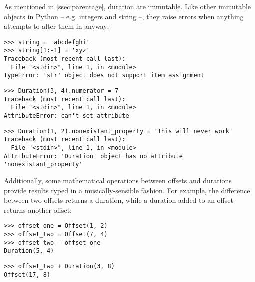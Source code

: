 \noindent As mentioned in \autoref{ssec:parentage}, duration are immutable.
Like other immutable objects in Python -- e.g. integers and string --, they
raise errors when anything attempts to alter them in anyway:

\begin{comment}
<abjad>[allow_exceptions]
string = 'abcdefghi'
string[1:-1] = 'xyz'
Duration(3, 4).numerator = 7
Duration(1, 2).nonexistant_property = 'This will never work'
</abjad>
\end{comment}

\begin{abjadbookoutput}
\begin{singlespacing}
\vspace{-0.5\baselineskip}
\begin{verbatim}
>>> string = 'abcdefghi'
>>> string[1:-1] = 'xyz'
Traceback (most recent call last):
  File "<stdin>", line 1, in <module>
TypeError: 'str' object does not support item assignment
\end{verbatim}
\begin{verbatim}
>>> Duration(3, 4).numerator = 7
Traceback (most recent call last):
  File "<stdin>", line 1, in <module>
AttributeError: can't set attribute
\end{verbatim}
\begin{verbatim}
>>> Duration(1, 2).nonexistant_property = 'This will never work'
Traceback (most recent call last):
  File "<stdin>", line 1, in <module>
AttributeError: 'Duration' object has no attribute 'nonexistant_property'
\end{verbatim}
\end{singlespacing}
\end{abjadbookoutput}

\noindent Additionally, some mathematical operations between offsets and
durations provide results typed in a musically-sensible fashion. For example,
the difference between two offsets returns a duration, while a duration added
to an offset returns another offset:

\begin{comment}
<abjad>
offset_one = Offset(1, 2)
offset_two = Offset(7, 4)
offset_two - offset_one
offset_two + Duration(3, 8)
</abjad>
\end{comment}

\begin{abjadbookoutput}
\begin{singlespacing}
\vspace{-0.5\baselineskip}
\begin{verbatim}
>>> offset_one = Offset(1, 2)
>>> offset_two = Offset(7, 4)
>>> offset_two - offset_one
Duration(5, 4)
\end{verbatim}
\begin{verbatim}
>>> offset_two + Duration(3, 8)
Offset(17, 8)
\end{verbatim}
\end{singlespacing}
\end{abjadbookoutput}

